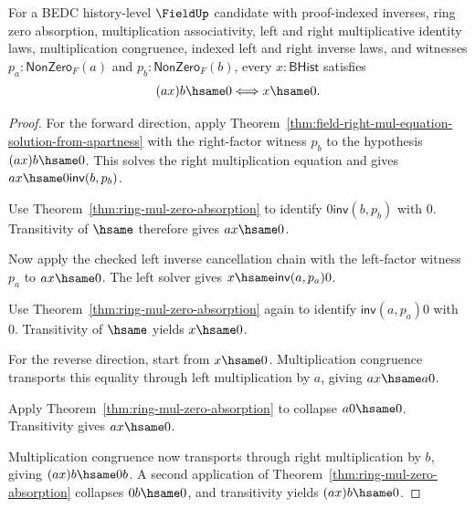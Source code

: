 \begin{theorem}
\label{thm:field-two-sided-zero-product-cancel-from-apartness}
For a BEDC history-level $\FieldUp$ candidate with proof-indexed inverses,
ring zero absorption, multiplication associativity, left and right
multiplicative identity laws, multiplication congruence, indexed left and
right inverse laws, and witnesses $p_a:\mathsf{NonZero}_F(a)$ and
$p_b:\mathsf{NonZero}_F(b)$, every $x:\mathsf{BHist}$ satisfies
$$
(a x)b\hsame0
\Longleftrightarrow
x\hsame0.
$$
\end{theorem}
\begin{proof}
For the forward direction, apply
Theorem~\ref{thm:field-right-mul-equation-solution-from-apartness} with the
right-factor witness $p_b$ to the hypothesis $(a x)b\hsame0$. This solves the
right multiplication equation and gives
$a x\hsame0\mathsf{inv}(b,p_b)$.

Use Theorem~\ref{thm:ring-mul-zero-absorption} to identify
$0\mathsf{inv}(b,p_b)$ with $0$. Transitivity of $\hsame$ therefore gives
$a x\hsame0$.

Now apply the checked left inverse cancellation chain with the left-factor
witness $p_a$ to $a x\hsame0$. The left solver gives
$x\hsame\mathsf{inv}(a,p_a)0$.

Use Theorem~\ref{thm:ring-mul-zero-absorption} again to identify
$\mathsf{inv}(a,p_a)0$ with $0$. Transitivity of $\hsame$ yields
$x\hsame0$.

For the reverse direction, start from $x\hsame0$. Multiplication congruence
transports this equality through left multiplication by $a$, giving
$a x\hsame a0$.

Apply Theorem~\ref{thm:ring-mul-zero-absorption} to collapse $a0\hsame0$.
Transitivity gives $a x\hsame0$.

Multiplication congruence now transports through right multiplication by $b$,
giving $(a x)b\hsame0b$. A second application of
Theorem~\ref{thm:ring-mul-zero-absorption} collapses $0b\hsame0$, and
transitivity yields $(a x)b\hsame0$.
\end{proof}

